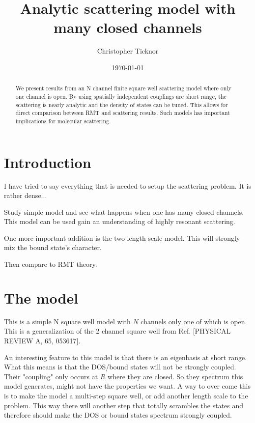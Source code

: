\documentclass[twocolumn,showpacs,amsmath,amssymb]{revtex4}
\begin{document}
\title {Analytic scattering model with many closed channels}
\author{Christopher Ticknor}
\date{\today}
\begin{abstract}
We present results from an N channel finite square well scattering model 
where only one channel is open.
By using spatially independent couplings are short range, 
the scattering is nearly analytic and the density of states can be tuned.
This allows for direct comparison between RMT and scattering results.  
Such models has important implications for molecular scattering. 
\end{abstract}
\maketitle
\section{Introduction}
I have tried to say everything that is needed to setup the scattering problem. 
It is rather dense...

Study simple model and see what happens when one
has many closed channels.
This model can be used gain an understanding of highly resonant scattering.

One more important addition is the two length scale model.
This will strongly mix the bound state's character.

Then compare to RMT theory.   

\section{The model}
This is a simple N square well model with 
$N$ channels only one of which is open.
This is a generalization of the 2 channel square well from
Ref.  [PHYSICAL REVIEW A,  65, 053617].

An interesting feature to this model is that there is an eigenbasis
at short range. What this means is that the DOS/bound states will 
not be strongly coupled. Their "coupling" only occurs at $R$ where 
they are closed. So they spectrum this model generates, might not
have the properties we want. A way to over come this is to make
the model a multi-step square well, or add another length scale to the problem. 
This way there will another step that totally scrambles the states and therefore should make the DOS or bound states spectrum strongly coupled. 
\end{document}
